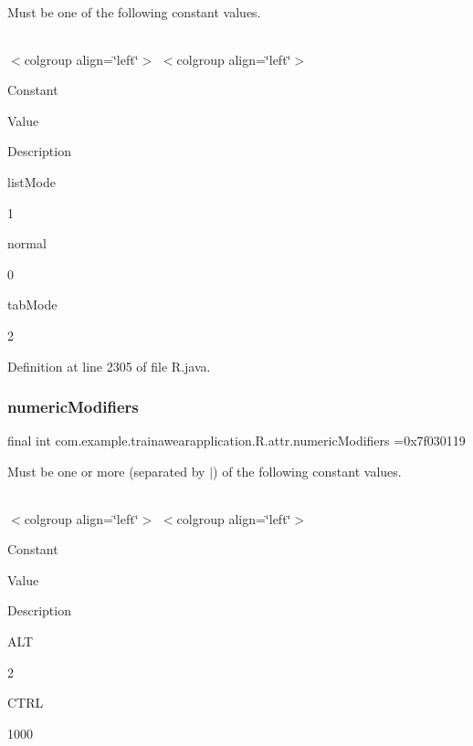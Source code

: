 Must be one of the following constant values.

\tabulinesep=1mm
\begin{longtabu}spread 0pt [c]{*{0}{|X[-1]}|}
\hline
\end{longtabu}
$<$colgroup align=\char`\"{}left\char`\"{}$>$ $<$colgroup align=\char`\"{}left\char`\"{}$>$ 

Constant

Value

Description 

list\+Mode

1

normal

0

tab\+Mode

2

Definition at line 2305 of file R.\+java.

\mbox{\label{classcom_1_1example_1_1trainawearapplication_1_1_r_1_1attr_a2a27937dc6d7ddeb8469614eb7cd1b81}} 
\subsubsection{\texorpdfstring{numericModifiers}{numericModifiers}}
{\footnotesize\ttfamily final int com.\+example.\+trainawearapplication.\+R.\+attr.\+numeric\+Modifiers =0x7f030119\hspace{0.3cm}{\ttfamily [static]}}

Must be one or more (separated by \textquotesingle{}$\vert$\textquotesingle{}) of the following constant values.

\tabulinesep=1mm
\begin{longtabu}spread 0pt [c]{*{0}{|X[-1]}|}
\hline
\end{longtabu}
$<$colgroup align=\char`\"{}left\char`\"{}$>$ $<$colgroup align=\char`\"{}left\char`\"{}$>$ 

Constant

Value

Description 

A\+LT

2

C\+T\+RL

1000

